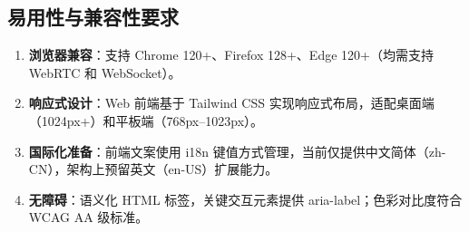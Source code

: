 \subsection{易用性与兼容性要求}

\begin{enumerate}[itemsep=0pt]
  \item \textbf{浏览器兼容}：支持 Chrome 120+、Firefox 128+、Edge 120+（均需支持 WebRTC 和 WebSocket）。
  \item \textbf{响应式设计}：Web 前端基于 Tailwind CSS 实现响应式布局，适配桌面端（1024px+）和平板端（768px--1023px）。
  \item \textbf{国际化准备}：前端文案使用 i18n 键值方式管理，当前仅提供中文简体（zh-CN），架构上预留英文（en-US）扩展能力。
  \item \textbf{无障碍}：语义化 HTML 标签，关键交互元素提供 aria-label；色彩对比度符合 WCAG AA 级标准。
\end{enumerate}
